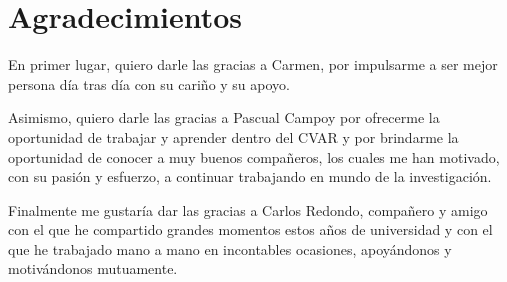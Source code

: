 
\chapter*{Agradecimientos}

En primer lugar, quiero darle las gracias a Carmen, por impulsarme a ser mejor persona día tras día con su cariño y su apoyo.

Asimismo, quiero darle las gracias a Pascual Campoy por ofrecerme la oportunidad de trabajar y aprender dentro del CVAR y por brindarme la oportunidad de conocer a muy buenos compañeros, los cuales me han motivado, con su pasión y esfuerzo, a continuar trabajando en mundo de la investigación.

Finalmente me gustaría dar las gracias a Carlos Redondo, compañero y amigo con el que he compartido grandes momentos estos años de universidad y con el que he trabajado mano a mano en incontables ocasiones, apoyándonos y motivándonos mutuamente. 




